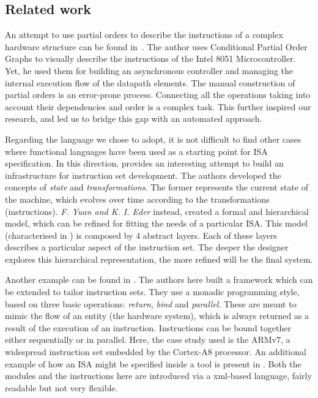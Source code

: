 \documentclass[conference]{IEEEtran}
\begin{document}
\subsection{Related work}

An attempt to use partial orders to describe the instructions of a complex hardware
structure can be found in~\cite{maxPhd}. The author uses Conditional Partial Order
Graphs to visually describe the instructions of the Intel 8051 Microcontroller.
Yet, he used them for building an asynchronous controller and managing the internal
execution flow of the datapath elements. The manual construction of partial orders
is an error-prone process. Connecting all the operations taking into account their
dependencies and order is a complex task. This further inspired our research, and
led us to bridge this gap with an automated approach.

Regarding the language we chose to adopt, it is not difficult to find other cases
where functional languages have been used as a starting point for ISA
specification. In this direction, \cite{isaFunc} provides an interesting attempt to
build an infrastructure for instruction set development. The authors developed the
concepts of \textit{state} and \textit{transformations}. The former represents the
current state of the machine, which evolves over time according to the
transformations (instructions). \textit{F. Yuan and K. I. Eder} instead, created a
formal and hierarchical model, which can be refined for fitting the needs of a
particular ISA. This model (characterised in \cite{isaEventB}) is composed by 4
abstract layers. Each of these layers describes a particular aspect of the
instruction set. The deeper the designer explores this hierarchical representation,
the more refined will be the final system.

Another example can be found in \cite{armv7}. The authors here built a framework
which can be extended to tailor instruction sets. They use a monadic programming
style, based on three basic operations: \textit{return}, \textit{bind} and
\textit{parallel}. These are meant to mimic the flow of an entity (the hardware
system), which is always returned as a result of the execution of an instruction.
Instructions can be bound together either sequentially or in parallel. Here, the
case study used is the ARMv7, a widespread instruction set embedded by the 
Cortex-A8 processor. An additional example of how an ISA might be specified inside
a tool is present in \cite{isaXml}. Both the modules and the instructions here are
introduced via a xml-based language, fairly readable but not very flexible.
\end{document}

